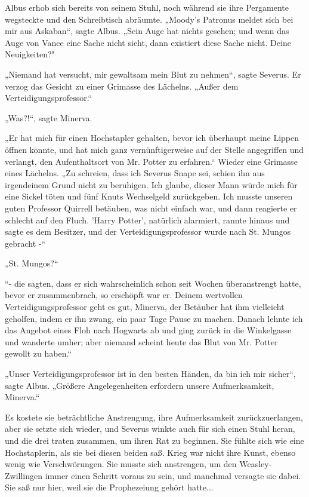{Albus erhob sich bereits von seinem Stuhl, noch während sie ihre Pergamente wegsteckte und den Schreibtisch abräumte. „Moody's Patronus meldet sich bei mir aus Askaban“, sagte Albus. „Sein Auge hat nichts gesehen; und wenn das Auge von Vance eine Sache nicht sieht, dann existiert diese Sache nicht. Deine Neuigkeiten?"

„Niemand hat versucht, mir gewaltsam mein Blut zu nehmen“, sagte Severus. Er verzog das Gesicht zu einer Grimasse des Lächelns. „Außer dem Verteidigungsprofessor.“

„Was?!“, sagte Minerva.

„Er hat mich für einen Hochstapler gehalten, bevor ich überhaupt meine Lippen öffnen konnte, und hat mich ganz vernünftigerweise auf der Stelle angegriffen und verlangt, den Aufenthaltsort von Mr. Potter zu erfahren.“ Wieder eine Grimasse eines Lächelns. „Zu schreien, dass ich Severus Snape sei, schien ihn aus irgendeinem Grund nicht zu beruhigen. Ich glaube, dieser Mann würde mich für eine Sickel töten und fünf Knuts Wechselgeld zurückgeben. Ich musste unseren guten Professor Quirrell betäuben, was nicht einfach war, und dann reagierte er schlecht auf den Fluch. 'Harry Potter', natürlich alarmiert, rannte hinaus und sagte es dem Besitzer, und der Verteidigungsprofessor wurde nach St. Mungos gebracht -“

„St. Mungos?“

“- die sagten, dass er sich wahrscheinlich schon seit Wochen überanstrengt hatte, bevor er zusammenbrach, so erschöpft war er. Deinem wertvollen Verteidigungsprofessor geht es gut, Minerva, der Betäuber hat ihm vielleicht geholfen, indem er ihn zwang, ein paar Tage Pause zu machen. Danach lehnte ich das Angebot eines Floh nach Hogwarts ab und ging zurück in die Winkelgasse und wanderte umher; aber niemand scheint heute das Blut von Mr. Potter gewollt zu haben.“

„Unser Verteidigungsprofessor ist in den besten Händen, da bin ich mir sicher“, sagte Albus. „Größere Angelegenheiten erfordern unsere Aufmerksamkeit, Minerva.“

Es kostete sie beträchtliche Anstrengung, ihre Aufmerksamkeit zurückzuerlangen, aber sie setzte sich wieder, und Severus winkte auch für sich einen Stuhl heran, und die drei traten zusammen, um ihren Rat zu beginnen. Sie fühlte sich wie eine Hochstaplerin, als sie bei diesen beiden saß. Krieg war nicht ihre Kunst, ebenso wenig wie Verschwörungen. Sie musste sich anstrengen, um den Weasley-Zwillingen immer einen Schritt voraus zu sein, und manchmal versagte sie dabei. Sie saß nur hier, weil sie die Prophezeiung gehört hatte...

}
